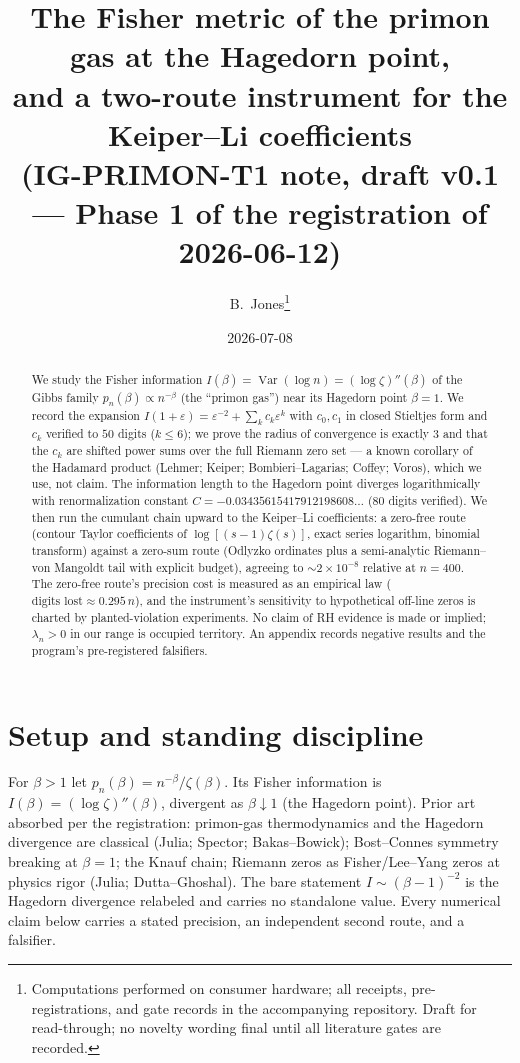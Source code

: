 \documentclass[11pt]{article}
\title{The Fisher metric of the primon gas at the Hagedorn point,\\
and a two-route instrument for the Keiper--Li coefficients\\
\large (IG-PRIMON-T1 note, draft v0.1 --- Phase 1 of the registration of 2026-06-12)}
\author{B.~Jones\thanks{Computations performed on consumer hardware; all receipts, pre-registrations,
and gate records in the accompanying repository. Draft for read-through; no novelty wording final
until all literature gates are recorded.}}
\date{2026-07-08}
\newcommand{\eps}{\varepsilon}
\begin{document}
\maketitle

\begin{abstract}
We study the Fisher information $I(\beta)=\operatorname{Var}(\log n)=(\log\zeta)''(\beta)$ of the
Gibbs family $p_n(\beta)\propto n^{-\beta}$ (the ``primon gas'') near its Hagedorn point $\beta=1$.
We record the expansion $I(1+\eps)=\eps^{-2}+\sum_k c_k\eps^k$ with $c_0,c_1$ in closed Stieltjes
form and $c_k$ verified to $50$ digits ($k\le 6$); we prove the radius of convergence is exactly $3$
and that the $c_k$ are shifted power sums over the full Riemann zero set --- a known corollary of the
Hadamard product (Lehmer; Keiper; Bombieri--Lagarias; Coffey; Voros), which we use, not claim. The
information length to the Hagedorn point diverges logarithmically with renormalization constant
$C=-0.03435615417912198608\ldots$ ($80$ digits verified). We then run the cumulant chain upward to
the Keiper--Li coefficients: a zero-free route (contour Taylor coefficients of $\log[(s-1)\zeta(s)]$,
exact series logarithm, binomial transform) against a zero-sum route (Odlyzko ordinates plus a
semi-analytic Riemann--von Mangoldt tail with explicit budget), agreeing to $\sim\!2\times10^{-8}$
relative at $n=400$. The zero-free route's precision cost is measured as an empirical law
($\text{digits lost}\approx 0.295\,n$), and the instrument's sensitivity to hypothetical off-line
zeros is charted by planted-violation experiments. No claim of RH evidence is made or implied;
$\lambda_n>0$ in our range is occupied territory. An appendix records negative results and the
program's pre-registered falsifiers.
\end{abstract}

\section{Setup and standing discipline}
For $\beta>1$ let $p_n(\beta)=n^{-\beta}/\zeta(\beta)$. Its Fisher information is
$I(\beta)=(\log\zeta)''(\beta)$, divergent as $\beta\downarrow 1$ (the Hagedorn point). Prior art
absorbed per the registration: primon-gas thermodynamics and the Hagedorn divergence are classical
(Julia; Spector; Bakas--Bowick); Bost--Connes symmetry breaking at $\beta=1$; the Knauf chain;
Riemann zeros as Fisher/Lee--Yang zeros at physics rigor (Julia; Dutta--Ghoshal). The bare statement
$I\sim(\beta-1)^{-2}$ is the Hagedorn divergence relabeled and carries no standalone value. Every
numerical claim below carries a stated precision, an independent second route, and a falsifier.
\end{document}
